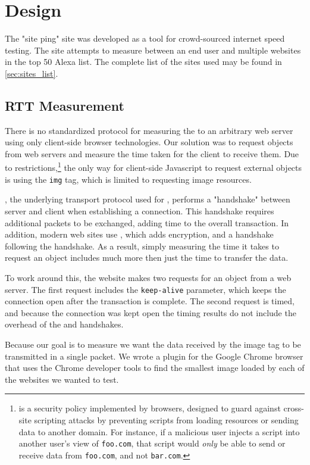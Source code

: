 \section{Design}\label{sec:design_web_ping}
The "site ping" site was developed as a tool for crowd-sourced internet speed testing. The site attempts to measure \rtt between an end user and multiple websites in the top 50 Alexa list. The complete list of the sites used may be found in \cref{sec:sites_list}.

\subsection{RTT Measurement}
There is no standardized protocol for measuring the \rtt to an arbitrary web server using only client-side browser technologies. Our solution was to request objects from web servers and measure the time taken for the client to receive them. Due to \cors restrictions,\footnote{\cors is a security policy implemented by browsers, designed to guard against cross-site scripting attacks by preventing scripts from loading resources or sending data to another domain. For instance, if a malicious user injects a script into another user's view of \texttt{foo.com}, that script would \textit{only} be able to send or receive data from \texttt{foo.com}, and not \texttt{bar.com}.} the only way for client-side Javascript to request external objects is using the \html \texttt{img} tag, which is limited to requesting image resources.

\TCP, the underlying transport protocol used for \http, performs a "handshake" between server and client when establishing a connection. This handshake requires additional packets to be exchanged, adding time to the overall transaction. In addition, modern web sites use \httpse, which adds \tls encryption, and a \tls handshake following the \tcp handshake. As a result, simply measuring the time it takes to request an object includes much more then just the time to transfer the data.

To work around this, the website makes two requests for an object from a web server. The first request includes the \http \texttt{keep-alive} parameter, which keeps the \tcp connection open after the transaction is complete. The second request is timed, and because the connection was kept open the timing results do not include the overhead of the \tcp and \tls handshakes.

Because our goal is to measure \rtt we want the data received by the image tag to be transmitted in a single packet. We wrote a plugin for the Google Chrome browser that uses the Chrome developer tools \api to find the smallest image loaded by each of the websites we wanted to test.

